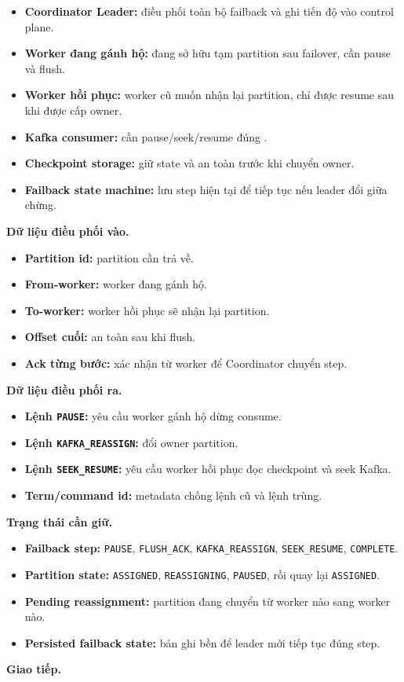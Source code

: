 \documentclass[12pt,a4paper]{article}
\begin{document}
\begin{itemize}
\item \textbf{Coordinator Leader:} điều phối toàn bộ failback và ghi tiến độ vào control plane.
\item \textbf{Worker đang gánh hộ:} đang sở hữu tạm partition sau failover, cần pause và flush.
\item \textbf{Worker hồi phục:} worker cũ muốn nhận lại partition, chỉ được resume sau khi được cấp owner.
\item \textbf{Kafka consumer:} cần pause/seek/resume đúng .
\item \textbf{Checkpoint storage:} giữ state và  an toàn trước khi chuyển owner.
\item \textbf{Failback state machine:} lưu step hiện tại để tiếp tục nếu leader đổi giữa chừng.
\end{itemize}
\textbf{Dữ liệu điều phối vào.}

\begin{itemize}
\item \textbf{Partition id:} partition cần trả về.
\item \textbf{From-worker:} worker đang gánh hộ.
\item \textbf{To-worker:} worker hồi phục sẽ nhận lại partition.
\item \textbf{Offset cuối:}  an toàn sau khi flush.
\item \textbf{Ack từng bước:} xác nhận từ worker để Coordinator chuyển step.
\end{itemize}
\textbf{Dữ liệu điều phối ra.}

\begin{itemize}
\item \textbf{Lệnh \texttt{PAUSE}:} yêu cầu worker gánh hộ dừng consume.
\item \textbf{Lệnh \texttt{KAFKA\_REASSIGN}:} đổi owner partition.
\item \textbf{Lệnh \texttt{SEEK\_RESUME}:} yêu cầu worker hồi phục đọc checkpoint và seek Kafka.
\item \textbf{Term/command id:} metadata chống lệnh cũ và lệnh trùng.
\end{itemize}
\textbf{Trạng thái cần giữ.}

\begin{itemize}
\item \textbf{Failback step:} \texttt{PAUSE}, \texttt{FLUSH\_ACK}, \texttt{KAFKA\_REASSIGN}, \texttt{SEEK\_RESUME}, \texttt{COMPLETE}.
\item \textbf{Partition state:} \texttt{ASSIGNED}, \texttt{REASSIGNING}, \texttt{PAUSED}, rồi quay lại \texttt{ASSIGNED}.
\item \textbf{Pending reassignment:} partition đang chuyển từ worker nào sang worker nào.
\item \textbf{Persisted failback state:} bản ghi bền để leader mới tiếp tục đúng step.
\end{itemize}
\textbf{Giao tiếp.}
\end{document}
